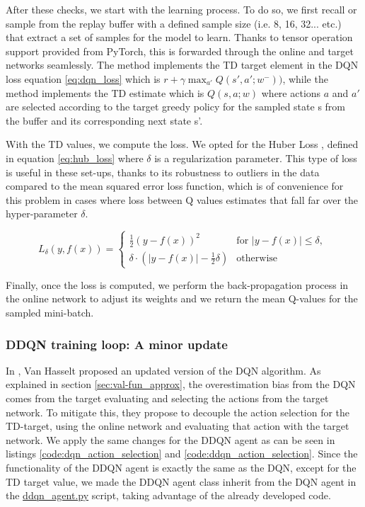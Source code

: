 After these checks, we start with the learning process. To do so, we first recall or sample from the replay buffer with a defined sample size (i.e. 8, 16, 32... etc.) that extract a set of samples for the model to learn. Thanks to tensor operation support provided from PyTorch, this is forwarded through the online and target networks seamlessly. The  method implements the TD target element in the DQN loss equation \ref{eq:dqn_loss} which is $r + \gamma \max_{a'} Q(s', a'; w^-))$, while the method  implements the TD estimate which is $Q(s, a; w)$ where actions $a$ and $a'$ are selected according to the target greedy policy for the sampled state s from the buffer and its corresponding next state s'.

With the TD values, we compute the loss. We opted for the Huber Loss \cite{9918637}, defined in equation \ref{eq:hub_loss} where $\delta$ is a regularization parameter. This type of loss is useful in these set-ups, thanks to its robustness to outliers in the data compared to the mean squared error loss function, which is of convenience for this problem in cases where loss between Q values estimates that fall far over the hyper-parameter $\delta$.

\begin{equation}
	\label{eq:hub_loss}
	L_{\delta}(y, f(x)) = 
	\begin{cases} 
		\frac{1}{2}(y-f(x))^2 & \text{for $|y-f(x)| \leq \delta$, } \\
		\delta \cdot \left(|y-f(x)| - \frac{1}{2}\delta \right) & \text{otherwise}
	\end{cases}
\end{equation}

Finally, once the loss is computed, we perform the back-propagation process in the online network to adjust its weights and we return the mean Q-values for the sampled mini-batch.

\subsubsection{DDQN training loop: A minor update}
\label{sec:ddqn_training_loop}
In \cite{vanhasselt2015deep}, Van Hasselt  proposed an updated version of the DQN algorithm. As explained in section \ref{sec:val-fun_approx}, the overestimation bias from the DQN comes from the target evaluating and selecting the actions from the target network. To mitigate this, they propose to decouple the action selection for the TD-target, using the online network and evaluating that action with the target network. We apply the same changes for the DDQN agent as can be seen in listings \ref{code:dqn_action_selection} and \ref{code:ddqn_action_selection}. Since the functionality of the DDQN agent is exactly the same as the DQN, except for the TD target value, we made the DDQN agent class inherit from the DQN agent in the \href{https://github.com/Javimh18/DL_TFM/blob/main/src/agents/ddqn_agent.py}{ddqn\_agent.py} script, taking advantage of the already developed code.

